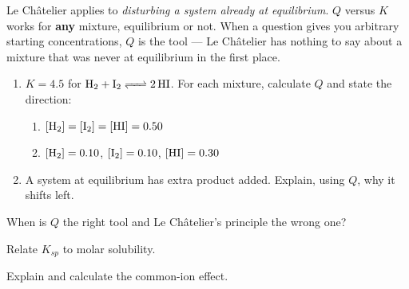 \documentclass{apchem-notes}
\begin{document}
\begin{apctrap}
Le Ch\^atelier applies to \emph{disturbing a system already at
equilibrium}. $Q$ versus $K$ works for \textbf{any} mixture, equilibrium or
not. When a question gives you arbitrary starting concentrations, $Q$ is the
tool --- Le Ch\^atelier has nothing to say about a mixture that was never at
equilibrium in the first place.
\end{apctrap}


\begin{enumerate}[leftmargin=*,itemsep=0.4em]
  \item $K = 4.5$ for $\ce{H2 + I2 <=> 2HI}$. For each mixture, calculate
        $Q$ and state the direction:
        \begin{enumerate}[leftmargin=1.4em,itemsep=0.2em]
          \item $[\ce{H2}]=[\ce{I2}]=[\ce{HI}]=0.50$
          \item $[\ce{H2}]=0.10$, $[\ce{I2}]=0.10$, $[\ce{HI}]=0.30$
        \end{enumerate}
  \item A system at equilibrium has extra product added. Explain, using
        $Q$, why it shifts left. 
\end{enumerate}

\begin{exitticket}
When is $Q$ the right tool and Le Ch\^atelier's principle the wrong one?
\end{exitticket}


\begin{objectives}
  \item Relate $K_{sp}$ to molar solubility.
  \item Explain and calculate the common-ion effect.
\end{objectives}
\end{document}
